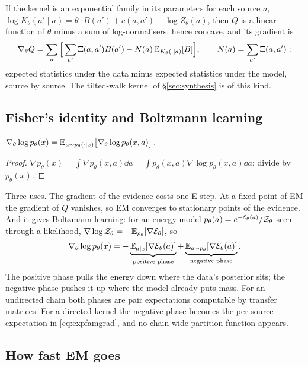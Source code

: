 If the kernel is an exponential family in its parameters for each source $a$,
$\log K_\theta(a'\mid a)=\theta\cdot B(a')+c(a,a')-\log Z_\theta(a)$, then $Q$ is a linear function of $\theta$ minus a sum
of log-normalisers, hence concave, and its gradient is
\begin{equation}\label{eq:expfamgrad}
  \nabla_\theta Q=\sum_{a}\Big[\sum_{a'}\Xi(a,a')B(a')-N(a)\,\mathbb{E}_{K_\theta(\cdot\mid a)}[B]\Big],\qquad N(a)=\sum_{a'}\Xi(a,a'):
\end{equation}
expected statistics under the data minus expected statistics under the model, source by source. The
tilted-walk kernel of \S\ref{sec:synthesis} is of this kind.

\subsection{Fisher's identity and Boltzmann learning}\label{sec:fisherid}

\begin{proposition}
$\nabla_\theta\log p_\theta(x)=\mathbb{E}_{a\sim p_\theta(\cdot\mid x)}\big[\nabla_\theta\log p_\theta(x,a)\big]$.
\end{proposition}
\begin{proof}
$\nabla p_\theta(x)=\int\nabla p_\theta(x,a)\dd a=\int p_\theta(x,a)\nabla\log p_\theta(x,a)\dd a$; divide by $p_\theta(x)$.
\end{proof}
Three uses. The gradient of the evidence costs one E-step. At a fixed point of EM the gradient of $Q$ vanishes,
so EM converges to stationary points of the evidence. And it gives Boltzmann learning: for an energy model
$p_\theta(a)=e^{-\mathcal{E}_\theta(a)}/\mathcal{Z}_\theta$ seen through a likelihood, $\nabla\log\mathcal{Z}_\theta=-\mathbb{E}_{p_\theta}[\nabla\mathcal{E}_\theta]$, so
\begin{equation}\label{eq:boltzmann}
  \nabla_\theta\log p_\theta(x)=-\underbrace{\mathbb{E}_{a\mid x}[\nabla\mathcal{E}_\theta(a)]}_{\text{positive phase}}+\underbrace{\mathbb{E}_{a\sim p_\theta}[\nabla\mathcal{E}_\theta(a)]}_{\text{negative phase}} .
\end{equation}
The positive phase pulls the energy down where the data's posterior sits; the negative phase pushes it up where
the model already puts mass. For an undirected chain both phases are pair expectations computable by transfer
matrices. For a directed kernel the negative phase becomes the per-source expectation in \eqref{eq:expfamgrad}, and
no chain-wide partition function appears.

\subsection{How fast EM goes}


